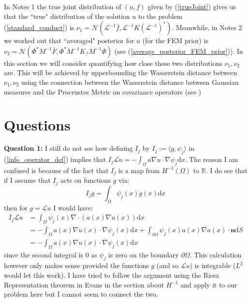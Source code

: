 \documentclass{article}
\theoremstyle{definition}
\theoremstyle{remark}
\begin{document}
In Notes 1 the true joint distribution of $(u,f)$ given by (\ref{trueJoint}) gives us that the ``true" distribution of the solution $u$ to the problem (\ref{standard_conduct}) is $\nu_{1}=\mathcal{N}(\mathcal{L}^{-1}\bar{f},\mathcal{L}^{-1}K(\mathcal{L}^{-1})^{*})$. Meanwhile, in Notes 2 we worked out that ``averaged" posterior for $u$ (for the FEM prior) is $\nu_{2}=\mathcal{N}(\Phi^{*}M^{-1}\bar{F},\Phi^{*}M^{-1}K_{\mathcal{I}}M^{-1}\Phi)$ (see (\ref{average_posterior_FEM_prior})). In this section we will consider quantifying how close these two distributions $\nu_{1},\nu_{2}$ are. This will be achieved by upperbounding the Wasserstein distance between $\nu_{1},\nu_{2}$ using the connection between the Wasserstein distance between Gaussian measures and the Procrustes Metric on covariance operators (see \cite{masarotto2019procrustes})

\section{Questions}

\noindent \textbf{Question 1:} I still do not see how defining $I_j$ by $I_j:=\langle g, \psi_j \rangle$ in (\ref{info_operator_def}) implies that $I_{j}\mathcal{L}u=-\int_{\Omega}a\nabla u \cdot \nabla\psi_{j}\mathrm{d}x$. The reason I am confused is because of the fact that $I_j$ is a map from $H^{-1}(\Omega)$ to $\mathbb{R}$. I do see that if I assume that $I_{j}$ acts on functions $g$ via:
\begin{equation*}
    I_{j}g=\int_{\Omega}\psi_{j}(x)g(x)\mathrm{d}x
\end{equation*}
then for $g=\mathcal{L}u$ I would have:
\begin{align*}
    I_{j}\mathcal{L}u&=\int_{\Omega}\psi_{j}(x)\nabla\cdot(a(x)\nabla u(x))\mathrm{d}x \\
    &=-\int_{\Omega}a(x)\nabla u(x)\cdot\nabla\psi_{j}(x)\mathrm{d}x + \int_{\partial\Omega}\psi_{j}(x)a(x)\nabla u(x)\cdot\mathbf{n}\mathrm{d}S \\
    &=-\int_{\Omega}a(x)\nabla u(x)\cdot\nabla\psi_{j}(x)\mathrm{d}x
\end{align*}
since the second integral is $0$ as $\psi_j$ is zero on the boundary $\partial\Omega$. This calculation however only makes sense provided the functions $g$ (and so $\mathcal{L}u$) is integrable ($L^2$ would let this work). I have tried to follow the argument using the Riesz Representation theorem in Evans in the section about $H^{-1}$ and apply it to our problem here but I cannot seem to connect the two. \\
\end{document}
